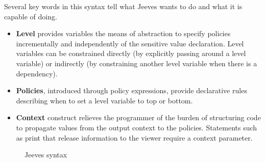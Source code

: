  Several key words in this syntax tell what Jeeves wants to do and what it is capable of doing. 
 \begin{itemize}
 \item \textbf{Level} provides variables the means of abstraction to specify policies incrementally and independently of the sensitive value declaration. Level variables can be constrained directly (by explicitly passing around a level variable) or indirectly (by constraining another level variable when there is a dependency).
 \item \textbf{Policies}, introduced through policy expressions, provide declarative rules describing when to set a level variable to top or bottom.
 \item \textbf{Context} construct relieves the programmer of the burden of structuring code to propagate values from the output context to the policies. Statements such as print that release information to the viewer require a context parameter.
 \end{itemize}
   \begin{figure}[!htbp]
    \caption{Jeeves syntax}
    \label{jeeve-syntax}
\end{figure}
